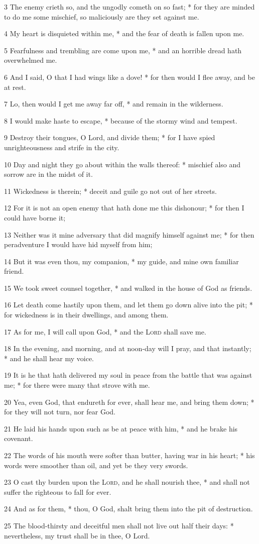 3 The enemy crieth so, and the ungodly cometh on so fast; * for they are minded to do me some mischief, so maliciously are they set against me.\par
4 My heart is disquieted within me, * and the fear of death is fallen upon me.\par
5 Fearfulness and trembling are come upon me, * and an horrible dread hath overwhelmed me.\par
6 And I said, O that I had wings like a dove! * for then would I flee away, and be at rest.\par
7 Lo, then would I get me away far off, * and remain in the wilderness.\par
8 I would make haste to escape, * because of the stormy wind and tempest.\par
9 Destroy their tongues, O Lord, and divide them; * for I have spied unrighteousness and strife in the city.\par
10 Day and night they go about within the walls thereof: * mischief also and sorrow are in the midst of it.\par
11 Wickedness is therein; * deceit and guile go not out of her streets.\par
12 For it is not an open enemy that hath done me this dishonour; * for then I could have borne it;\par
13 Neither was it mine adversary that did magnify himself against me; * for then peradventure I would have hid myself from him;\par
14 But it was even thou, my companion, * my guide, and mine own familiar friend.\par
15 We took sweet counsel together, * and walked in the house of God as friends.\par
16 Let death come hastily upon them, and let them go down alive into the pit; * for wickedness is in their dwellings, and among them.\par
17 As for me, I will call upon God, * and the {\textsc{Lord}} shall save me.\par
18 In the evening, and morning, and at noon-day will I pray, and that instantly; * and he shall hear my voice.\par
19 It is he that hath delivered my soul in peace from the battle that was against me; * for there were many that strove with me.\par
20 Yea, even God, that endureth for ever, shall hear me, and bring them down; * for they will not turn, nor fear God.\par
21 He laid his hands upon such as be at peace with him, * and he brake his covenant.\par
22 The words of his mouth were softer than butter, having war in his heart; * his words were smoother than oil, and yet be they very swords.\par
23 O cast thy burden upon the {\textsc{Lord}}, and he shall nourish thee, * and shall not suffer the righteous to fall for ever.\par
24 And as for them, * thou, O God, shalt bring them into the pit of destruction.\par
25 The blood-thirsty and deceitful men shall not live out half their days: * nevertheless, my trust shall be in thee, O Lord.
